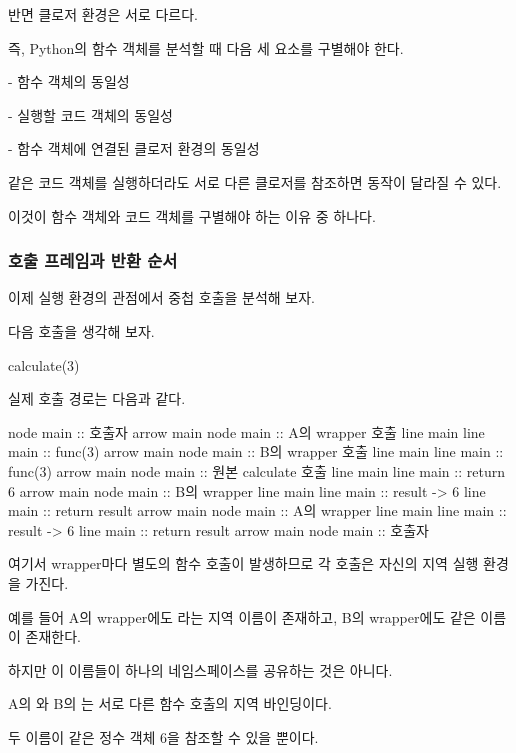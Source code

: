 반면 클로저 환경은 서로 다르다.

즉, Python의 함수 객체를 분석할 때 다음 세 요소를 구별해야 한다.

\begin{dhksmry}
    - 함수 객체의 동일성

    - 실행할 코드 객체의 동일성

    - 함수 객체에 연결된 클로저 환경의 동일성
\end{dhksmry}

같은 코드 객체를 실행하더라도 서로 다른 클로저를 참조하면 동작이 달라질 수 있다.

이것이 함수 객체와 코드 객체를 구별해야 하는 이유 중 하나다.

\subsubsection{호출 프레임과 반환 순서}

이제 실행 환경의 관점에서 중첩 호출을 분석해 보자.

다음 호출을 생각해 보자.

\begin{dhkcode}
calculate(3)
\end{dhkcode}

실제 호출 경로는 다음과 같다.

\begin{dhkbranch}[in=8]
node main :: 호출자
arrow main
node main :: A의 wrapper 호출
line main
line main :: func(3)
arrow main
node main :: B의 wrapper 호출
line main
line main :: func(3)
arrow main
node main :: 원본 calculate 호출
line main
line main :: return 6
arrow main
node main :: B의 wrapper
line main
line main :: result -> 6
line main :: return result
arrow main
node main :: A의 wrapper
line main
line main :: result -> 6
line main :: return result
arrow main
node main :: 호출자
\end{dhkbranch}

여기서 wrapper마다 별도의 함수 호출이 발생하므로 각 호출은 자신의 지역 실행 환경을 가진다.

예를 들어 A의 wrapper에도 라는 지역 이름이 존재하고, B의 wrapper에도 같은 이름이 존재한다.

하지만 이 이름들이 하나의 네임스페이스를 공유하는 것은 아니다.

A의 와 B의 는 서로 다른 함수 호출의 지역 바인딩이다.

두 이름이 같은 정수 객체 6을 참조할 수 있을 뿐이다.

